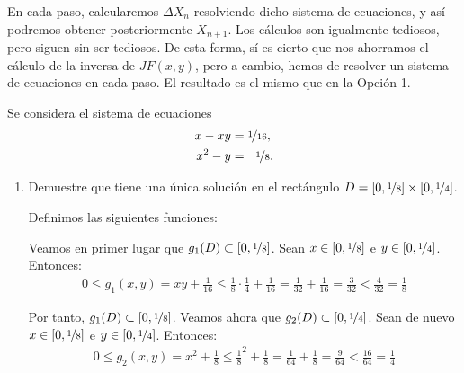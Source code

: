 \begin{ejercicio}
\begin{enumerate}
\begin{description}
            En cada paso, calcularemos $\Delta X_n$ resolviendo dicho sistema de ecuaciones, y así podremos obtener posteriormente $X_{n+1}$. Los cálculos son igualmente tediosos, pero siguen sin ser tediosos. De esta forma, sí es cierto que nos ahorramos el cálculo de la inversa de $JF(x,y)$, pero a cambio, hemos de resolver un sistema de ecuaciones en cada paso. El resultado es el mismo que en la Opción 1.
        \end{description}
    \end{enumerate}
\end{ejercicio}


\begin{ejercicio}\label{ej:1.1.18}
    Se considera el sistema de ecuaciones
    \begin{align*}
        x - xy &= \nicefrac{1}{16}, \\
        x^2 - y &= \nicefrac{-1}{8}.
    \end{align*}
    \begin{enumerate}
        \item Demuestre que tiene una única solución en el rectángulo $D = [0, \nicefrac{1}{8}] \times [0, \nicefrac{1}{4}]$.
        
        Definimos las siguientes funciones:

        Veamos en primer lugar que $g_1(D)\subset [0,\nicefrac{1}{8}]$. Sean $x\in [0,\nicefrac{1}{8}]$ e $y\in [0,\nicefrac{1}{4}]$. Entonces:
        \begin{align*}
            0\leq g_1(x,y)=xy+\frac{1}{16}\leq \frac{1}{8}\cdot\frac{1}{4}+\frac{1}{16}=\frac{1}{32}+\frac{1}{16}=\frac{3}{32}<\frac{4}{32}=\frac{1}{8}
        \end{align*}

        Por tanto, $g_1(D)\subset [0,\nicefrac{1}{8}]$. Veamos ahora que $g_2(D)\subset [0,\nicefrac{1}{4}]$. Sean de nuevo $x\in [0,\nicefrac{1}{8}]$ e $y\in [0,\nicefrac{1}{4}]$. Entonces:
        \begin{align*}
            0\leq g_2(x,y)=x^2+\frac{1}{8}\leq \frac{1}{8}^2+\frac{1}{8}=\frac{1}{64}+\frac{1}{8}=\frac{9}{64}<\frac{16}{64}=\frac{1}{4}
        \end{align*}


\end{enumerate}
\end{ejercicio}
